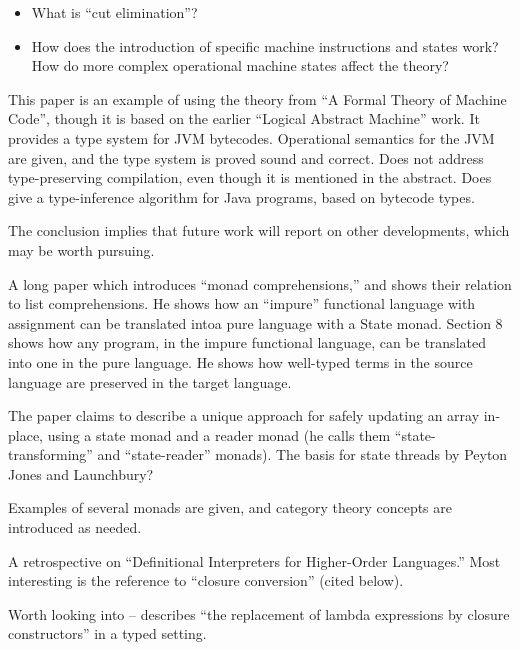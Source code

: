 \documentclass[11pt]{article}
\begin{document}
\begin{itemize}
\item What is ``cut elimination''?
\item How does the introduction of specific machine instructions and states work? How do more
  complex operational machine states affect the theory?
\end{itemize}


This paper is an example of using the theory from ``A Formal Theory of
Machine Code'', though it is based on the earlier ``Logical Abstract
Machine'' work. It provides a type system for JVM
bytecodes. Operational semantics for the JVM are given, and the type
system is proved sound and correct. Does not address type-preserving
compilation, even though it is mentioned in the abstract. Does give a
type-inference algorithm for Java programs, based on bytecode types.

The conclusion implies that future work will report on other
developments, which may be worth pursuing.


A long paper which introduces ``monad comprehensions,'' and shows
their relation to list comprehensions. He shows how an ``impure''
functional language with assignment can be translated intoa pure
language with a State monad. Section 8 shows how any program, in the
impure functional language, can be translated into one in the pure
language. He shows how well-typed terms in the source language are
preserved in the target language.

The paper claims to describe a unique approach for safely updating an
array in-place, using a state monad and a reader monad (he calls them
``state-transforming'' and ``state-reader'' monads). The basis for
state threads by Peyton Jones and Launchbury?

Examples of several monads are given, and category theory concepts are
introduced as needed.


A retrospective on ``Definitional Interpreters for Higher-Order
Languages.'' Most interesting is the reference to ``closure
conversion'' (cited below).


Worth looking into -- describes ``the replacement of lambda
expressions by closure constructors'' in a typed setting.
\end{document}
